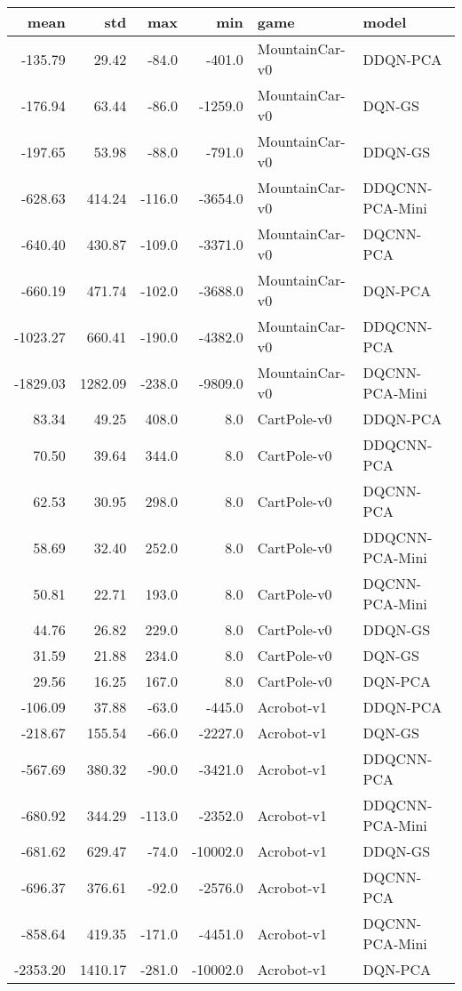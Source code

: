 \begin{tabular}{rrrrll}
\toprule
    mean &      std &    max &      min &            game &            model \\
\midrule
 -135.79 &    29.42 &  -84.0 &   -401.0 &  MountainCar-v0 &         DDQN-PCA \\
 -176.94 &    63.44 &  -86.0 &  -1259.0 &  MountainCar-v0 &           DQN-GS \\
 -197.65 &    53.98 &  -88.0 &   -791.0 &  MountainCar-v0 &          DDQN-GS \\
 -628.63 &   414.24 & -116.0 &  -3654.0 &  MountainCar-v0 &  DDQCNN-PCA-Mini \\
 -640.40 &   430.87 & -109.0 &  -3371.0 &  MountainCar-v0 &        DQCNN-PCA \\
 -660.19 &   471.74 & -102.0 &  -3688.0 &  MountainCar-v0 &          DQN-PCA \\
-1023.27 &   660.41 & -190.0 &  -4382.0 &  MountainCar-v0 &       DDQCNN-PCA \\
-1829.03 &  1282.09 & -238.0 &  -9809.0 &  MountainCar-v0 &   DQCNN-PCA-Mini \\
   83.34 &    49.25 &  408.0 &      8.0 &     CartPole-v0 &         DDQN-PCA \\
   70.50 &    39.64 &  344.0 &      8.0 &     CartPole-v0 &       DDQCNN-PCA \\
   62.53 &    30.95 &  298.0 &      8.0 &     CartPole-v0 &        DQCNN-PCA \\
   58.69 &    32.40 &  252.0 &      8.0 &     CartPole-v0 &  DDQCNN-PCA-Mini \\
   50.81 &    22.71 &  193.0 &      8.0 &     CartPole-v0 &   DQCNN-PCA-Mini \\
   44.76 &    26.82 &  229.0 &      8.0 &     CartPole-v0 &          DDQN-GS \\
   31.59 &    21.88 &  234.0 &      8.0 &     CartPole-v0 &           DQN-GS \\
   29.56 &    16.25 &  167.0 &      8.0 &     CartPole-v0 &          DQN-PCA \\
 -106.09 &    37.88 &  -63.0 &   -445.0 &      Acrobot-v1 &         DDQN-PCA \\
 -218.67 &   155.54 &  -66.0 &  -2227.0 &      Acrobot-v1 &           DQN-GS \\
 -567.69 &   380.32 &  -90.0 &  -3421.0 &      Acrobot-v1 &       DDQCNN-PCA \\
 -680.92 &   344.29 & -113.0 &  -2352.0 &      Acrobot-v1 &  DDQCNN-PCA-Mini \\
 -681.62 &   629.47 &  -74.0 & -10002.0 &      Acrobot-v1 &          DDQN-GS \\
 -696.37 &   376.61 &  -92.0 &  -2576.0 &      Acrobot-v1 &        DQCNN-PCA \\
 -858.64 &   419.35 & -171.0 &  -4451.0 &      Acrobot-v1 &   DQCNN-PCA-Mini \\
-2353.20 &  1410.17 & -281.0 & -10002.0 &      Acrobot-v1 &          DQN-PCA \\
\bottomrule
\end{tabular}
